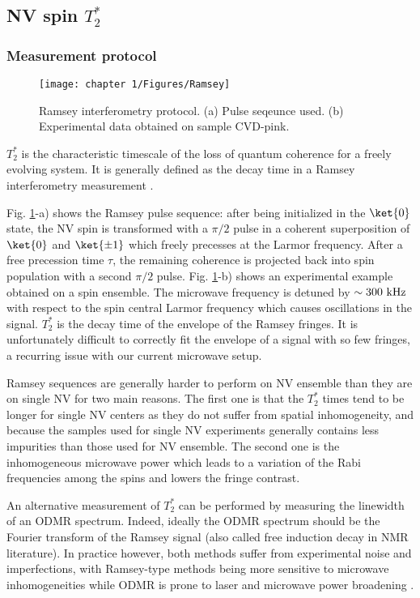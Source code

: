 \documentclass[a4paper, 11pt]{report}
\begin{document}
\subsection{NV spin $T_2^*$}
\subsubsection{Measurement protocol}
\begin{figure}[h!]
\centering
\texttt{[image: chapter 1/Figures/Ramsey]}
\caption{Ramsey interferometry protocol. (a) Pulse seqeunce used. (b) Experimental data obtained on sample CVD-pink.} %
\label{Ramsey}
\end{figure}

$T_2^*$ is the characteristic timescale of the loss of quantum coherence for a freely evolving system. It is generally defined as the decay time in a Ramsey interferometry measurement \citep{barry2020sensitivity}.

Fig. \ref{Ramsey}-a) shows the Ramsey pulse sequence: after being initialized in the $\ket{0}$ state, the NV spin is transformed with a $\pi/2$ pulse in a coherent superposition of $\ket{0}$ and $\ket{\pm 1}$ which freely precesses at the Larmor frequency. After a free precession time $\tau$, the remaining coherence is projected back into spin population with a second $\pi/2$ pulse. Fig. \ref{Ramsey}-b) shows an experimental example obtained on a spin ensemble. The microwave frequency is detuned by $\sim 300\ \rm kHz$ with respect to the spin central Larmor frequency which causes oscillations in the signal. $T_2^*$ is the decay time of the envelope of the Ramsey fringes. It is unfortunately difficult to correctly fit the envelope of a signal with so few fringes, a recurring issue with our current microwave setup. 

Ramsey sequences are generally harder to perform on NV ensemble than they are on single NV for two main reasons. The first one is that the $T_2^*$ times tend to be longer for single NV centers as they do not suffer from spatial inhomogeneity, and because the samples used for single NV experiments generally contains less impurities than those used for NV ensemble. The second one is the inhomogeneous microwave power which leads to a variation of the Rabi frequencies among the spins \citep{barry2016optical, zhou2020quantum} and lowers the fringe contrast.

An alternative measurement of $T_2^*$ can be performed by measuring the linewidth of an ODMR spectrum. Indeed, ideally the ODMR spectrum should be the Fourier transform of the Ramsey signal (also called free induction decay in NMR literature). In practice however, both methods suffer from experimental noise and imperfections, with Ramsey-type methods being more sensitive to microwave inhomogeneities \citep{barry2020sensitivity} while ODMR is prone to laser and microwave power broadening \citep{dreau2011avoiding}. 
\end{document}

